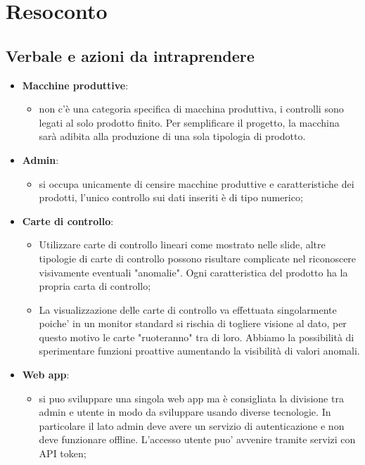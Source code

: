 \section{Resoconto}
\subsection{Verbale e azioni da intraprendere}

\begin{itemize}
	\item \textbf{Macchine produttive}:
		\begin{itemize}
			\item non c'è una categoria specifica di macchina produttiva, i controlli sono legati al  solo prodotto finito. Per semplificare il progetto, la macchina sarà adibita alla produzione di una sola tipologia di prodotto.
		\end{itemize}
	\item \textbf{Admin}:
		\begin{itemize}
			\item si occupa unicamente di censire macchine produttive e caratteristiche dei prodotti, l'unico controllo sui dati inseriti è di tipo numerico;
		\end{itemize}
	\item \textbf{Carte di controllo}:
		\begin{itemize}
			\item Utilizzare carte di controllo lineari come mostrato nelle slide, altre tipologie di carte di controllo possono risultare complicate nel riconoscere visivamente eventuali "anomalie". Ogni caratteristica del prodotto ha la propria carta di controllo;
			\item La visualizzazione delle carte di controllo va effettuata singolarmente poiche' in un monitor standard si rischia di togliere visione al dato, per questo motivo le carte "ruoteranno" tra di loro. Abbiamo la possibilità di sperimentare funzioni proattive aumentando la visibilità di valori anomali.
		\end{itemize}
	\item \textbf{Web app}:
		\begin{itemize}
			\item si puo sviluppare una singola web app ma è consigliata la divisione tra admin e utente in modo da sviluppare usando diverse tecnologie. In particolare il lato admin deve avere un servizio di autenticazione e non deve funzionare offline. L'accesso utente puo' avvenire tramite servizi con API token;

\end{itemize}
\end{itemize}

